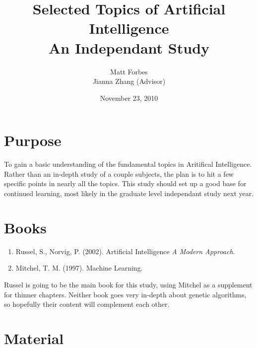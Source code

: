\documentclass[a4paper,12pt]{article}
\begin{document}
\title{Selected Topics of Artificial Intelligence\\
{\normalsize An Independant Study}}
\author{Matt Forbes \\ Jianna Zhang (Advisor)}
\date{November 23, 2010}
\maketitle

\section*{Purpose}
To gain a basic understanding of the fundamental topics in Aritifical
Intelligence. Rather than an in-depth study of a couple subjects, the
plan is to hit a few specific points in nearly all the topics. This
study should set up a good base for continued learning, most likely in
the graduate level independant study next year.

\section*{Books}

\begin{enumerate}[1)]

\item Russel, S., Norvig, P. (2002). Artificial Intelligence {\it A Modern Approach}.
\item Mitchel, T. M. (1997). Machine Learning.
  
\end{enumerate}

Russel is going to be the main book for this study, using Mitchel as a
supplement for thinner chapters. Neither book goes very in-depth about
genetic algorithms, so hopefully their content will complement each other.

\section*{Material}
\end{document}
